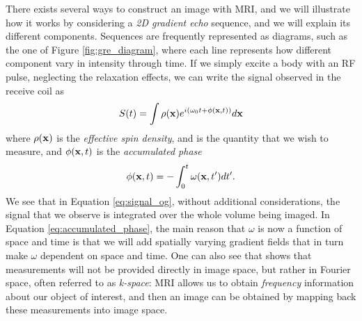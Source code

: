 There exists several ways to construct an image with MRI, and we will illustrate how it works by considering a \textit{2D gradient echo} sequence, and we will explain its different components. Sequences are frequently represented as diagrams, such as the one of Figure \ref{fig:gre_diagram}, where each line represents how different component vary in intensity through time. If we simply excite a body with an RF pulse, neglecting the relaxation effects, we can write the signal observed in the receive coil as
\begin{equation}
    S(t) = \int \rho(\mathbf{x}) e^{i(\omega_0 t + \phi(\mathbf{x},t))} d\mathbf{x}\label{eq:signal_og}
\end{equation}
where $\rho(\mathbf{x})$ is the \textit{effective spin density}, and is the quantity that we wish to measure, and $\phi(\mathbf{x},t)$ is the \textit{accumulated phase}
\begin{equation}
    \phi(\mathbf{x},t) = - \int_0^t \omega(\mathbf{x},t')dt'. \label{eq:accumulated_phase}
\end{equation} 
We see that in Equation \ref{eq:signal_og}, without additional considerations, the signal that we observe is integrated over the whole volume being imaged. In Equation \ref{eq:accumulated_phase}, the main reason that $\omega$ is now a function of space and time is that we will add spatially varying gradient fields that in turn make $\omega$ dependent on space and time. One can also see that  shows that measurements will not be provided directly in image space, but rather in Fourier space, often referred to as \textit{k-space}: MRI allows us to obtain \textit{frequency} information about our object of interest, and then an image can be obtained by mapping back these measurements into image space. 


